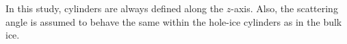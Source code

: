 In this study, cylinders are always defined along the $z$-axis. Also, the scattering angle is assumed to behave the same within the hole-ice cylinders as in the bulk ice.

